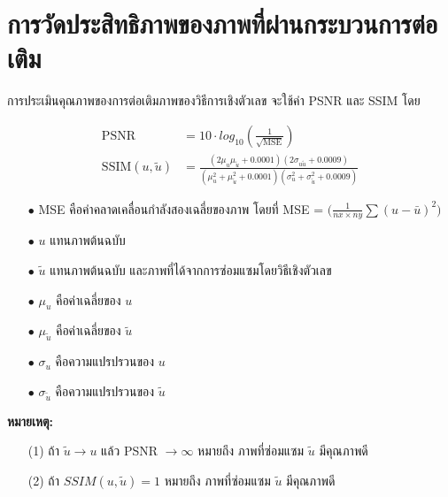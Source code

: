 \section{การวัดประสิทธิภาพของภาพที่ผ่านกระบวนการต่อเติม}	

\hspace{1cm} การประเมินคุณภาพของการต่อเติมภาพของวิธีการเชิงตัวเลข จะใช้ค่า PSNR \cite{ref:PSNR} และ SSIM \cite{ref:SSIM} โดย
	
\begin{align*}
	\text{PSNR}  &= 10 \cdot log_{10} ( \frac{1}{\sqrt{\text{MSE}}} ) \\
	\text{SSIM}(u,\tilde{u}) &= \frac{(2\mu_u\mu_{\tilde{u}} + 0.0001)(2\sigma_{u\tilde{u}} + 0.0009)}{(\mu_u^2+\mu_{\tilde{u}}^2+0.0001)(\sigma_u^2+\sigma_{\tilde{u}}^2+0.0009)}
\end{align*}
	
\begin{itemize}
	\item[$\bullet$] MSE คือค่าคลาดเคลื่อนกำลังสองเฉลี่ยของภาพ โดยที่ MSE = $\bigg( \frac{1}{nx \times ny} \sum (u - \bar{u})^2  \bigg)$
	\item[$\bullet$] $u$ แทนภาพต้นฉบับ
	\item[$\bullet$] $\tilde{u}$  แทนภาพต้นฉบับ และภาพที่ได้จากการซ่อมแซมโดยวิธีเชิงตัวเลข
	\item[$\bullet$] $\mu_u$ คือค่าเฉลี่ยของ $u$
	\item[$\bullet$] $\mu_{\tilde{u}}$ คือค่าเฉลี่ยของ $\tilde{u}$
	\item[$\bullet$]  $\sigma_u$ คือความแปรปรวนของ $u$ 
	\item[$\bullet$] $\sigma_{\tilde{u}}$ คือความแปรปรวนของ $\tilde{u}$
\end{itemize}
	
\textbf{หมายเหตุ:}
\begin{itemize}
	\item [(1)] ถ้า $\tilde{u} \longrightarrow u $ แล้ว PSNR $\longrightarrow \infty$ หมายถึง ภาพที่ซ่อมแซม $\tilde{u}$ มีคุณภาพดี
	\item [(2)] ถ้า $SSIM(u,\tilde{u}) = 1 $
	หมายถึง ภาพที่ซ่อมแซม $\tilde{u}$ มีคุณภาพดี
\end{itemize}
	

